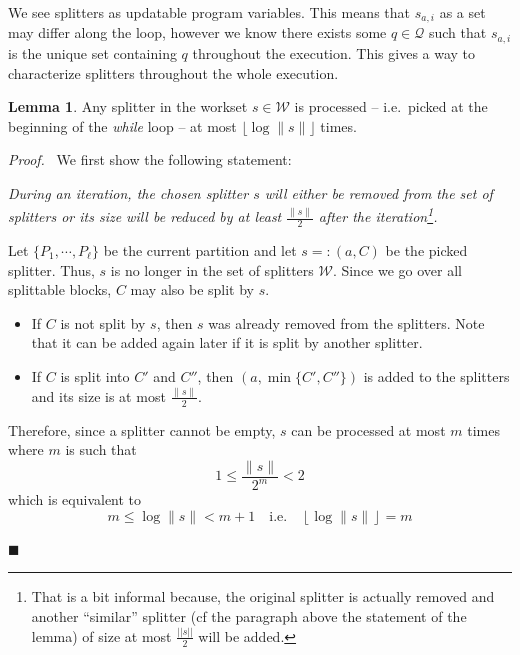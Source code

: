 \documentclass[12pt, a4 paper]{article}
\renewenvironment{proof}[1][Proof]{\begin{mdframed}[backgroundcolor=black!5, topline=false, rightline=false, bottomline=false, linecolor=black!15, linewidth=3pt]{\noindent\textit{#1.}\ }}{\noindent\par\hfill$\blacksquare$\end{mdframed}}
\theoremstyle{definition}
\newtheorem{lemma}{Lemma}
\begin{document}
We see splitters as updatable program variables. This means that $s_{a,i}$ as a set may differ along the loop, however we know there exists some $q \in \mathcal{Q}$ such that $s_{a,i}$ is the unique set containing $q$ throughout the execution. This gives a way to characterize splitters throughout the whole execution.

\bigskip

\begin{lemma}\label{lem:log}
    Any splitter in the workset $s \in \mathcal{W}$ is processed -- i.e.\ picked at the beginning of the \textit{while} loop -- at most $\lfloor \log \| s \| \rfloor$ times.
\end{lemma}
\begin{proof}
    We first show the following statement:

    \textit{During an iteration, the chosen splitter $s$ will either be removed from the set of splitters or its size will be reduced by at least $\frac{\| s\|}{2}$ after the iteration\footnote{That is a bit informal because, the original splitter is actually removed and another ``similar'' splitter (cf the paragraph above the statement of the lemma) of size at most $\frac{||s||}{2}$ will be added.}.}

    \bigskip
    Let $\{P_1, \cdots, P_\ell\}$ be the current partition and let $s =: (a, C)$ be the picked splitter. Thus, $s$ is no longer in the set of splitters $\mathcal{W}$. Since we go over all splittable blocks, $C$ may also be split by $s$.
    \begin{itemize}
        \item If $C$ is not split by $s$, then $s$ was already removed from the splitters. Note that it can be added again later if it is split by another splitter.
        \item If $C$ is split into $C'$ and $C''$, then $(a, \min\{C', C''\})$ is added to the splitters and its size is at most $\frac{\| s \|}{2}$.
    \end{itemize}
    Therefore, since a splitter cannot be empty, $s$ can be processed at most $m$ times where $m$ is such that
    $$ 1 \leq \frac{\| s \|}{2^m} < 2$$
    which is equivalent to
    $$ m \leq \log \| s \| < m + 1 \quad \text{i.e.}\quad \left\lfloor\log \| s \|\right\rfloor = m $$
\end{proof}

\bigskip
\end{document}
